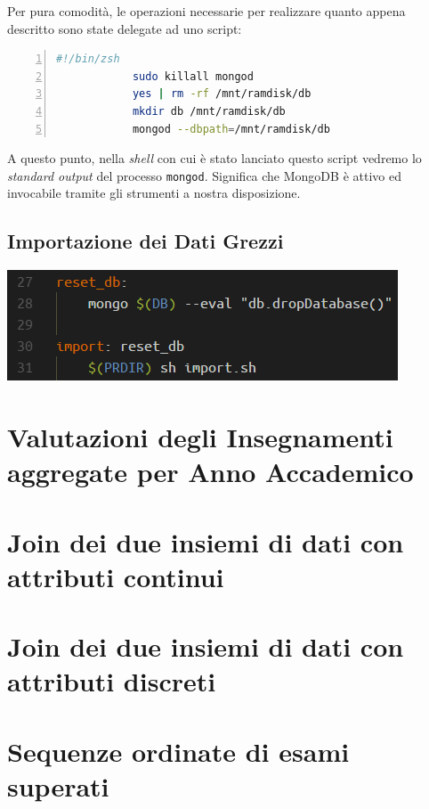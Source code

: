 	Per pura comodità, le operazioni necessarie per realizzare quanto appena descritto sono state delegate ad uno script:

		\begin{lstlisting}[language=bash,caption={script di lancio di un server MongoDB}, numbers=left, stepnumber=1]
			#!/bin/zsh
			sudo killall mongod
			yes | rm -rf /mnt/ramdisk/db
			mkdir db /mnt/ramdisk/db
			mongod --dbpath=/mnt/ramdisk/db
		\end{lstlisting}

	A questo punto, nella \textit{shell} con cui è stato lanciato questo script vedremo lo \textit{standard output} del processo \texttt{mongod}. Significa che MongoDB è attivo ed invocabile tramite gli strumenti a nostra disposizione.

	\subsection{Importazione dei Dati Grezzi}

	\begin{center}
		\includegraphics[scale=0.7]{img/import.png}
	\end{center}

	

\section{Valutazioni degli Insegnamenti aggregate per Anno Accademico}

\section{Join dei due insiemi di dati con attributi continui}

\section{Join dei due insiemi di dati con attributi discreti}

\section{Sequenze ordinate di esami superati}

